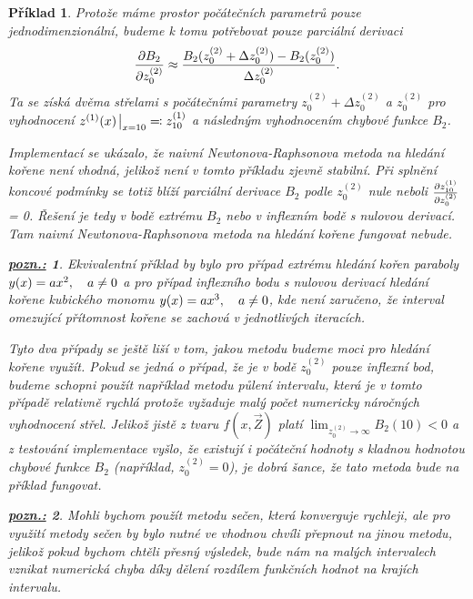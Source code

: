 \documentclass{article}
\newtheorem{example}{Příklad}
\newtheorem*{remark}{\underline{\it pozn.:}}
\begin{document}
\begin{example}
	\smallskip

	Protože máme prostor počátečních parametrů pouze jednodimenzionální, budeme k tomu potřebovat pouze parciální derivaci
	\begin{equation}
		\pdv{B_{2}}{z^{(2)}_{0}} \approx \frac{B_{2}(z^{(2)}_{0} + \Delta z^{(2)}_{0}) - B_{2}(z^{(2)}_{0})}{\Delta z^{(2)}_{0}}.
	\end{equation}
	Ta se získá dvěma střelami s počátečními parametry $z^{(2)}_{0} + \Delta z^{(2)}_{0}$ a $z^{(2)}_{0}$ pro vyhodnocení $z^{(1)}(x)\eval_{x=10} \eqqcolon z^{(1)}_{10}$ a následným vyhodnocením chybové funkce $B_{2}$.

	\bigskip

	Implementací se ukázalo, že naivní Newtonova-Raphsonova metoda na hledání kořene není vhodná, jelikož není v tomto příkladu zjevně stabilní. Při splnění koncové podmínky se totiž blíží parciální derivace $B_{2}$ podle $z^{(2)}_{0}$ nule neboli $\pdv{z^{(1)}_{10}}{z^{(2)}_{0}}$ = 0. Řešení je tedy v bodě extrému $B_{2}$ nebo v inflexním bodě s nulovou derivací. Tam naivní Newtonova-Raphsonova metoda na hledání kořene fungovat nebude.
	\begin{remark}
		Ekvivalentní příklad by bylo pro případ extrému hledání kořen paraboly $y(x) = ax^2\qcomma a \neq 0$ a pro případ inflexního bodu s nulovou derivací hledání kořene kubického monomu $y(x) = ax^3\qcomma a \neq 0$, kde není zaručeno, že interval omezující přítomnost kořene se zachová v jednotlivých iteracích.
	\end{remark}

	Tyto dva případy se ještě liší v tom, jakou metodu budeme moci pro hledání kořene využít. Pokud se jedná o případ, že je v bodě $z^{(2)}_{0}$ pouze inflexní bod, budeme schopni použít například metodu půlení intervalu, která je v tomto případě relativně rychlá protože vyžaduje malý počet numericky náročných vyhodnocení střel. Jelikož jistě z tvaru $f(x, \vec{Z})$ platí $\lim_{z^{(2)}_{0} \to \infty} B_{2}(10) < 0$ a z testování implementace vyšlo, že existují i počáteční hodnoty s kladnou hodnotou chybové funkce $B_{2}$ (například, $z^{(2)}_{0} = 0$), je dobrá šance, že tato metoda bude na příklad fungovat.

	\begin{remark}
		Mohli bychom použít metodu sečen, která konverguje rychleji, ale pro využití metody sečen by bylo nutné ve vhodnou chvíli přepnout na jinou metodu, jelikož pokud bychom chtěli přesný výsledek, bude nám na malých intervalech vznikat numerická chyba díky dělení rozdílem funkčních hodnot na krajích intervalu.


\end{remark}
\end{example}
\end{document}
